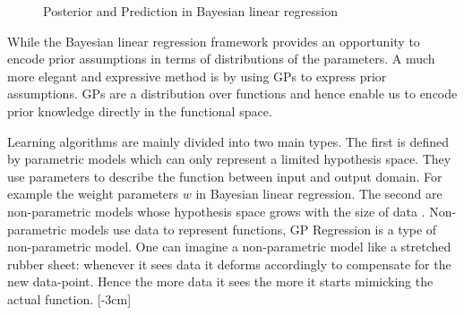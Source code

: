 \begin{figure}[!ht]
  \centering
{}\quad
{}\quad
       \caption{Posterior and Prediction in Bayesian linear regression}
       \label{figPriorAndPosterior}
\end{figure}

While the Bayesian linear regression framework provides an opportunity to encode prior assumptions in terms of distributions of the parameters. A much more elegant and expressive method is by using GPs to express prior assumptions. GPs are a distribution over functions and hence enable us to encode prior knowledge directly in the functional space. 

Learning algorithms are mainly divided into two main types. The first is defined by parametric models which can only represent a limited hypothesis space. They use parameters to describe the function between input and output domain. For example the weight parameters $w$ in Bayesian linear regression. The second are non-parametric models whose hypothesis space grows with the size of data \cite{ghahramani2013bayesian}. Non-parametric models use data to represent functions, GP Regression is a type of non-parametric model. One can imagine a non-parametric model like a stretched rubber sheet: whenever it sees data it deforms accordingly to compensate for the new data-point. Hence the more data it sees the more it starts mimicking the actual function. 
[-3cm]


